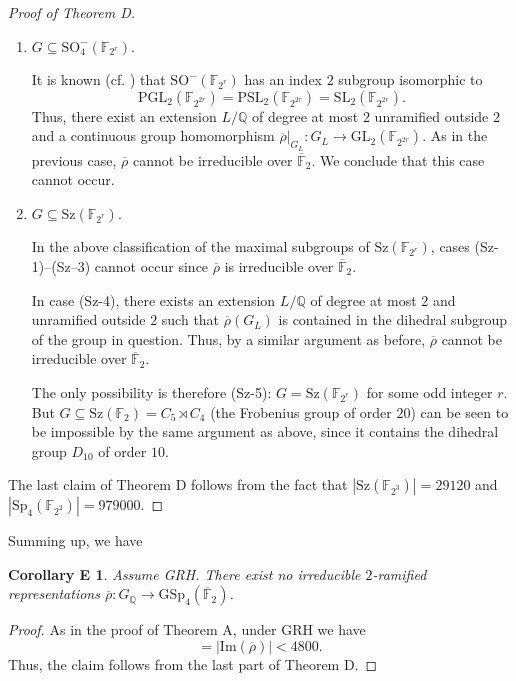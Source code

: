 \documentclass{amsart}
\newtheorem*{corE}{Corollary E}
\theoremstyle{definition}
\newcommand{\lra}{\longrightarrow}
\newcommand{\Q}{\mathbb{Q}}
\newcommand{\F}{\mathbb{F}}
\newcommand{\bF}{\overline{\F}}
\newcommand{\br}{\overline{\rho}}
\newcommand{\GSp}{\mathrm{GSp}}
\newcommand{\Sp}{\mathrm{Sp}}
\newcommand{\GL}{\mathrm{GL}}
\newcommand{\SO}{\mathrm{SO}}
\newcommand{\PSL}{\mathrm{PSL}}
\newcommand{\PGL}{\mathrm{PGL}}
\newcommand{\SL}{\mathrm{SL}}
\newcommand{\Sz}{\mathrm{Sz}}
\newcommand{\im}{\mathrm{Im}}
\begin{document}
\begin{proof}[Proof of Theorem D]
\begin{enumerate}
    \item $G\subseteq \SO_4^-(\F_{2^r})$.

      It is known (cf. \cite[Section 7.2.2]{BHRD}) that  $\SO^-(\F_{2^r})$ has an index $2$ subgroup isomorphic to
      \begin{equation*}
        \PGL_2(\F_{2^{2r}})=\PSL_2(\F_{2^{2r}})=\SL_2(\F_{2^{2r}}).
      \end{equation*}
      Thus,
      there exist an extension $L/\Q$ of degree at most $2$ unramified outside $2$ and a continuous group homomorphism $\br|_{G_L}:G_L\lra \GL_2(\F_{2^{2r}})$.
      As in the previous case, $\br$ cannot be irreducible over $\bF_2$.
      We conclude that this case cannot occur.

    \item $G\subseteq \Sz(\F_{2^r})$.

      In the above classification of the maximal subgroups of $\Sz(\F_{2^r})$,
      cases (Sz-1)--(Sz--3) cannot occur since $\br$ is irreducible over $\bF_2$.

      In case (Sz-4), there exists an extension $L/\Q$ of degree at most $2$ and unramified outside $2$ such that
      $\br(G_L)$ is contained in the dihedral subgroup of the  group in question.
      Thus, by a similar argument as before, $\br$ cannot be irreducible over $\bF_2$.

      The only possibility is therefore (Sz-5): $G=\Sz(\F_{2^r})$ for some odd integer $r$.
      But $G\subseteq \Sz(\F_{2})=C_5\rtimes C_4$ (the Frobenius group
      of order $20$) can be seen to be impossible by the same argument as above, since it contains the dihedral group $D_{10}$ of order $10$.
  \end{enumerate}

  The last claim of Theorem D follows from the fact that $|\Sz(\F_{2^3})|=29120$ and $|\Sp_4(\F_{2^2})|=979000$.
\end{proof}
Summing up, we have
\begin{corE}
  Assume GRH.
  There exist no irreducible $2$-ramified representations $\br:G_\Q\lra \GSp_4(\bF_2)$.
\end{corE}
\begin{proof}As in the proof of Theorem A, under GRH we have
  \begin{equation*}
    [\Q_{\br}:\Q]=|\im(\br)|<4800.
  \end{equation*}
  Thus, the claim follows from the last part of Theorem D.
\end{proof}
\end{document}
